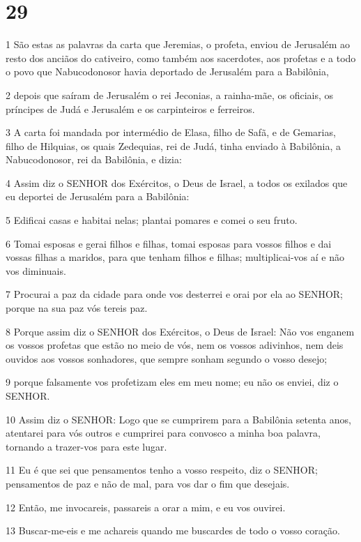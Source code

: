 \chapter{29}

\par 1 São estas as palavras da carta que Jeremias, o profeta, enviou de Jerusalém ao resto dos anciãos do cativeiro, como também aos sacerdotes, aos profetas e a todo o povo que Nabucodonosor havia deportado de Jerusalém para a Babilônia,
\par 2 depois que saíram de Jerusalém o rei Jeconias, a rainha-mãe, os oficiais, os príncipes de Judá e Jerusalém e os carpinteiros e ferreiros.
\par 3 A carta foi mandada por intermédio de Elasa, filho de Safã, e de Gemarias, filho de Hilquias, os quais Zedequias, rei de Judá, tinha enviado à Babilônia, a Nabucodonosor, rei da Babilônia, e dizia:
\par 4 Assim diz o SENHOR dos Exércitos, o Deus de Israel, a todos os exilados que eu deportei de Jerusalém para a Babilônia:
\par 5 Edificai casas e habitai nelas; plantai pomares e comei o seu fruto.
\par 6 Tomai esposas e gerai filhos e filhas, tomai esposas para vossos filhos e dai vossas filhas a maridos, para que tenham filhos e filhas; multiplicai-vos aí e não vos diminuais.
\par 7 Procurai a paz da cidade para onde vos desterrei e orai por ela ao SENHOR; porque na sua paz vós tereis paz.
\par 8 Porque assim diz o SENHOR dos Exércitos, o Deus de Israel: Não vos enganem os vossos profetas que estão no meio de vós, nem os vossos adivinhos, nem deis ouvidos aos vossos sonhadores, que sempre sonham segundo o vosso desejo;
\par 9 porque falsamente vos profetizam eles em meu nome; eu não os enviei, diz o SENHOR.
\par 10 Assim diz o SENHOR: Logo que se cumprirem para a Babilônia setenta anos, atentarei para vós outros e cumprirei para convosco a minha boa palavra, tornando a trazer-vos para este lugar.
\par 11 Eu é que sei que pensamentos tenho a vosso respeito, diz o SENHOR; pensamentos de paz e não de mal, para vos dar o fim que desejais.
\par 12 Então, me invocareis, passareis a orar a mim, e eu vos ouvirei.
\par 13 Buscar-me-eis e me achareis quando me buscardes de todo o vosso coração.
